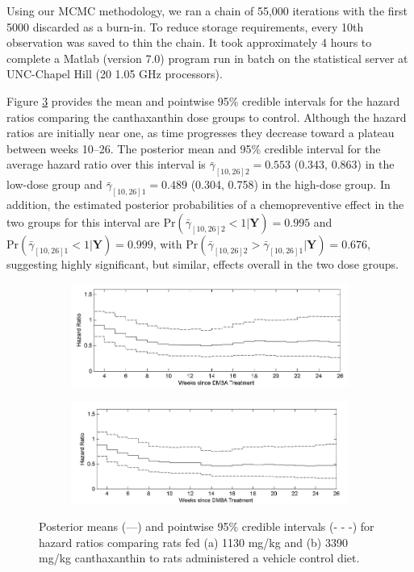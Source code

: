 \documentclass[10pt, letterpaper]{article}
\begin{document}
Using our MCMC methodology, we ran a chain of 55,000 iterations with the first 5000 discarded as a burn-in. To reduce storage requirements, every 10th observation was saved to thin the chain. It took approximately 4 hours to complete a Matlab (version 7.0) program run in batch on the statistical server at UNC-Chapel Hill (20 1.05 GHz processors).

Figure \ref{fig:1} provides the mean and pointwise 95\% credible intervals for the hazard ratios comparing the canthaxanthin dose groups to control. Although the hazard ratios are initially near one, as time progresses they decrease toward a plateau between weeks 10--26. The posterior mean and 95\% credible interval for the average hazard ratio over this interval is $\bar{\gamma}_{[10,26]2} = 0.553$ (0.343, 0.863) in the low-dose group and $\bar{\gamma}_{[10,26]1} = 0.489$ (0.304, 0.758) in the high-dose group. In addition, the estimated posterior probabilities of a chemopreventive effect in the two groups for this interval are $\text{Pr}(\bar{\gamma}_{[10,26]2} < 1 | \mathbf{Y}) = 0.995$ and $\text{Pr}(\bar{\gamma}_{[10,26]1} < 1 | \mathbf{Y}) = 0.999$, with $\text{Pr}(\bar{\gamma}_{[10,26]2} > \bar{\gamma}_{[10,26]1} | \mathbf{Y}) = 0.676$, suggesting highly significant, but similar, effects overall in the two dose groups.

\begin{figure}[htbp]
    \centering
    \begin{subfigure}[b]{0.8\textwidth}
        \includegraphics[width=\textwidth]{figure1a.png} %
        \caption{}
        \label{fig:1a}
    \end{subfigure}
    \vfill
    \begin{subfigure}[b]{0.8\textwidth}
        \includegraphics[width=\textwidth]{figure1b.png} %
        \caption{}
        \label{fig:1b}
    \end{subfigure}
    \caption{Posterior means (---) and pointwise 95\% credible intervals (- - -) for hazard ratios comparing rats fed (a) 1130 mg/kg and (b) 3390 mg/kg canthaxanthin to rats administered a vehicle control diet.}
    \label{fig:1}
\end{figure}
\end{document}
